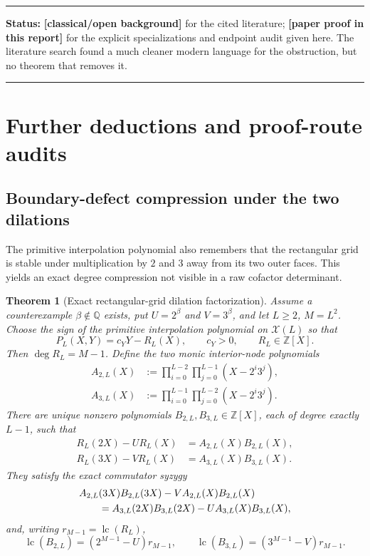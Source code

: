 \documentclass[11pt,oneside]{article}
\newtheorem{theorem}{Theorem}[section]
\theoremstyle{definition}
\theoremstyle{remark}
\newcommand{\Z}{\mathbb Z}
\newcommand{\Q}{\mathbb Q}
\newcommand{\statusnew}{\textcolor{newgreen}{\textbf{[paper proof in this report]}}}
\newcommand{\statusknown}{\textcolor{classicalgray}{\textbf{[classical/open background]}}}
\newenvironment{statusbox}[1]
{\begin{center}\begin{minipage}{0.94\textwidth}\raggedright\hbadness=10000\hrule
\vspace{0.45em}\textbf{Status:} #1\par\vspace{0.35em}}
{\vspace{0.35em}\hrule\end{minipage}\end{center}}
\begin{document}
\begin{statusbox}{\statusknown{} for the cited literature; \statusnew{} for the explicit
specializations and endpoint audit given here.  The literature search found a much cleaner
modern language for the obstruction, but no theorem that removes it.}
\end{statusbox}

\section{Further deductions and proof-route audits}
\label{sec:thirdattempts}

\subsection{Boundary-defect compression under the two dilations}

The primitive interpolation polynomial also remembers that the rectangular grid is stable
under multiplication by $2$ and $3$ away from its two outer faces.  This yields an exact
degree compression not visible in a raw cofactor determinant.

\begin{theorem}[Exact rectangular-grid dilation factorization]
\label{c3:thm-dilation-defect}
Assume a counterexample $\beta\notin\Q$ exists, put $U=2^\beta$ and $V=3^\beta$, and let
$L\ge2$, $M=L^2$.  Choose the sign of the primitive interpolation polynomial on
$\mathcal X(L)$ so that
\begin{equation}
 P_L(X,Y)=c_YY-R_L(X),
 \qquad c_Y>0,
 \qquad R_L\in\Z[X].
 \label{c3:eq-PL-RL}
\end{equation}
Then $\deg R_L=M-1$.  Define the two monic interior-node polynomials
\begin{align}
 A_{2,L}(X)&:=
 \prod_{i=0}^{L-2}\prod_{j=0}^{L-1}(X-2^i3^j),
 \\
 A_{3,L}(X)&:=
 \prod_{i=0}^{L-1}\prod_{j=0}^{L-2}(X-2^i3^j).
 \label{c3:eq-interior-node-polys}
\end{align}
There are unique nonzero polynomials $B_{2,L},B_{3,L}\in\Z[X]$, each of degree exactly
$L-1$, such that
\begin{align}
 R_L(2X)-U R_L(X)&=A_{2,L}(X)B_{2,L}(X),
 \label{c3:eq-2-defect}\\
 R_L(3X)-V R_L(X)&=A_{3,L}(X)B_{3,L}(X).
 \label{c3:eq-3-defect}
\end{align}
They satisfy the exact commutator syzygy
\begin{align}
&A_{2,L}(3X)B_{2,L}(3X)-V A_{2,L}(X)B_{2,L}(X)
\notag\\
&\qquad =A_{3,L}(2X)B_{3,L}(2X)-U A_{3,L}(X)B_{3,L}(X),
 \label{c3:eq-defect-syzygy}
\end{align}
and, writing $r_{M-1}=\operatorname{lc}(R_L)$,
\begin{equation}
 \operatorname{lc}(B_{2,L})=(2^{M-1}-U)r_{M-1},
 \qquad
 \operatorname{lc}(B_{3,L})=(3^{M-1}-V)r_{M-1}.
 \label{c3:eq-defect-leading}
\end{equation}
\end{theorem}
\end{document}
